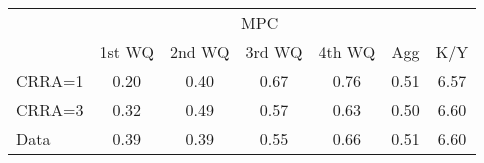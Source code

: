 \begin{tabular}{@{}lcccccc@{}} 
\toprule 
                  & \multicolumn{5}{c}{MPC} &   \\   
                  &  1st WQ  & 2nd WQ  & 3rd WQ & 4th WQ  & Agg  &  K/Y  \\  \midrule 
CRRA=1 &0.20 & 0.40 & 0.67 & 0.76 & 0.51 & 6.57 \\ 
CRRA=3 &0.32 & 0.49 & 0.57 & 0.63 & 0.50 & 6.60 \\ 
Data &0.39 & 0.39 & 0.55 & 0.66 & 0.51 & 6.60 \\ 
\end{tabular}  
